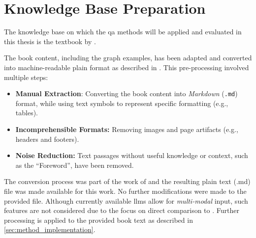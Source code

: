 \section{Knowledge Base Preparation}\label{sec:knowledge_base_prep}

The knowledge base on which the \ac{qa} methods will be applied and evaluated in this thesis is the textbook  by \citeauthor{bb2}. 

The book content, including the graph examples, has been adapted and converted into machine-readable plain format as described in \citet{Paul_Keller}.
This pre-processing involved multiple steps:
\begin{itemize}
    \item \textbf{Manual Extraction}: Converting the book content into \textit{Markdown} (\texttt{.md}) format, while using text symbols to represent specific formatting (e.g., tables).
    \item \textbf{Incomprehensible Formats:} Removing images and page artifacts (e.g., headers and footers).
    \item \textbf{Noise Reduction:} Text passages without useful knowledge or context, such as the \enquote{Foreword}, have been removed. 
\end{itemize}
The conversion process was part of the work of \citet{Paul_Keller} and the resulting plain text (.md) file was made available for this work.
No further modifications were made to the provided file.
%
Although currently available \acp{llm} allow for \textit{multi-modal} input, such features are not considered due to the focus on direct comparison to \citet{Paul_Keller}.
%
Further processing is applied to the provided book text as described in \cref{sec:method_implementation}.
%
